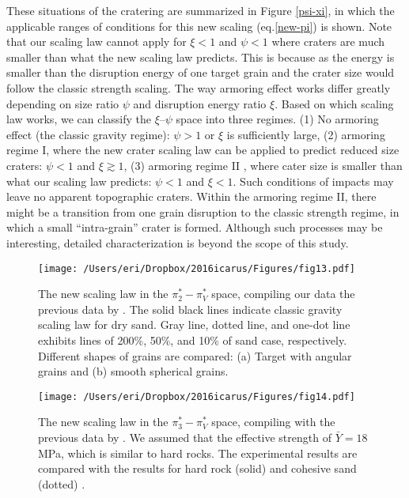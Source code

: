 \documentclass[3p,authoryear]{elsarticle}
\newcommand{\II}{I\hspace{-.1 em}I}
\begin{document}
These situations of the cratering are summarized in Figure \ref{psi-xi}, in which the applicable ranges of conditions for this new scaling (eq.\eqref{new-pi}) is shown. Note that our scaling law cannot apply for $\xi<1$ and $\psi<1$ where craters are much smaller than what the new scaling law predicts.
This is because as the energy is smaller than the disruption energy of one target grain and the crater size would follow the classic strength scaling.
The way armoring effect works differ greatly depending on size ratio $\psi$ and disruption energy ratio $\xi$.
Based on which scaling law works, we can classify the $\xi$--$\psi$ space into three regimes.
(1) No armoring effect (the classic gravity regime): $\psi>1$ or $\xi$ is sufficiently large, (2) armoring regime I, where the new crater scaling law can be applied to predict reduced size craters: $\psi<1$ and $\xi \gtrsim 1$, (3) armoring regime {\II} , where cater size is smaller than what our scaling law predicts: $\psi<1$ and $\xi<1$.
Such conditions of impacts may leave no apparent topographic craters. Within the armoring regime \II, there might be a transition from one grain disruption to the classic strength regime, in which a small ``intra-grain'' crater is formed. Although such processes may be interesting, detailed characterization is  beyond the scope of this study.

\begin{figure*}[tbp]
	\centering
	\texttt{[image: /Users/eri/Dropbox/2016icarus/Figures/fig13.pdf]}
	\caption{The new scaling law in the $\pi_2^*- \pi_V^*$ space, compiling our data the previous data by \citet{schmidt1980, mizutani1983, cintala1999, yamamoto2006, guettler2012, holsapple2014}. The solid black lines indicate classic gravity scaling law for dry sand. Gray line, dotted line, and one-dot line exhibits lines of 200\%, 50\%, and 10\% of sand case, respectively. Different shapes of grains are compared: (a) Target with angular grains and (b) smooth spherical grains.}
	\label{newpi2}
	\centering
\end{figure*}
\begin{figure}[htbp]
	\centering
	\texttt{[image: /Users/eri/Dropbox/2016icarus/Figures/fig14.pdf]}
	\caption{The new scaling law in the $\pi_3^*- \pi_V^*$ space, compiling with the previous data by \citet{schmidt1980, mizutani1983, cintala1999, yamamoto2006, guettler2012, holsapple2014}. We assumed that the effective strength of $\bar{Y}=18$ MPa, which is similar to hard rocks. The experimental results are compared with the results for hard rock (solid) and cohesive sand (dotted) \citep{schmidt1987}.}
	\label{newpi3}
	\centering
\end{figure}
\end{document}
